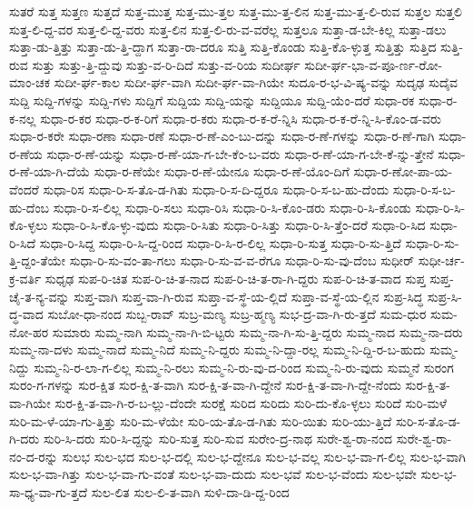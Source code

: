 {ಸುತರೆ
ಸುತ್ತ
ಸುತ್ತಣ
ಸುತ್ತದೆ
ಸುತ್ತ-ಮುತ್ತ
ಸುತ್ತ-ಮು-ತ್ತಲ
ಸುತ್ತ-ಮು-ತ್ತ-ಲಿನ
ಸುತ್ತ-ಮು-ತ್ತ-ಲಿ-ರುವ
ಸುತ್ತಲ
ಸುತ್ತಲಿ
ಸುತ್ತ-ಲಿ-ದ್ದ-ವರ
ಸುತ್ತ-ಲಿ-ದ್ದ-ವರು
ಸುತ್ತ-ಲಿನ
ಸುತ್ತ-ಲಿ-ರು-ವ-ವರೆಲ್ಲ
ಸುತ್ತಲೂ
ಸುತ್ತಾ-ಡ-ಬೇ-ಕಿಲ್ಲ
ಸುತ್ತಾ-ಡಲು
ಸುತ್ತಾ-ಡು-ತ್ತಿತ್ತು
ಸುತ್ತಾ-ಡು-ತ್ತಿ-ದ್ದಾಗ
ಸುತ್ತಾ-ರಾ-ದರೂ
ಸುತ್ತಿ
ಸುತ್ತಿ-ಕೊಂಡು
ಸುತ್ತಿ-ಕೊ-ಳ್ಳುತ್ತ
ಸುತ್ತಿತ್ತು
ಸುತ್ತಿದ
ಸುತ್ತಿ-ರುವ
ಸುತ್ತು
ಸುತ್ತು-ತ್ತಿ-ದ್ದುವು
ಸುತ್ತು-ವ-ರಿ-ದಿದೆ
ಸುತ್ತು-ವ-ರಿಯ
ಸುದೀರ್ಘ
ಸುದೀ-ರ್ಘ-ಭಾ-ವ-ಪೂ-ರ್ಣ-ರೋ-ಮಾಂ-ಚಕ
ಸುದೀ-ರ್ಘ-ಕಾಲ
ಸುದೀ-ರ್ಘ-ವಾಗಿ
ಸುದೀ-ರ್ಘ-ವಾ-ಗಿಯೇ
ಸುದೂ-ರ-ಭ-ವಿ-ಷ್ಯ-ವನ್ನು
ಸುದೃಢ
ಸುದೈವ
ಸುದ್ದಿ
ಸುದ್ದಿ-ಗಳನ್ನು
ಸುದ್ದಿ-ಗಳು
ಸುದ್ದಿಗೆ
ಸುದ್ದಿಯ
ಸುದ್ದಿ-ಯನ್ನು
ಸುದ್ದಿಯೂ
ಸುದ್ದಿ-ಯೆಂ-ದರೆ
ಸುಧಾ-ರಕ
ಸುಧಾ-ರ-ಕ-ನಲ್ಲ
ಸುಧಾ-ರ-ಕರ
ಸುಧಾ-ರ-ಕ-ರಿಗೆ
ಸುಧಾ-ರ-ಕರು
ಸುಧಾ-ರ-ಕ-ರೆ-ನ್ನಿಸಿ
ಸುಧಾ-ರ-ಕ-ರೆ-ನ್ನಿ-ಸಿ-ಕೊಂ-ಡ-ವರು
ಸುಧಾ-ರ-ಕರೇ
ಸುಧಾ-ರಣಾ
ಸುಧಾ-ರಣೆ
ಸುಧಾ-ರ-ಣೆ-ಎಂ-ಬು-ದನ್ನು
ಸುಧಾ-ರ-ಣೆ-ಗಳನ್ನು
ಸುಧಾ-ರ-ಣೆ-ಗಾಗಿ
ಸುಧಾ-ರ-ಣೆಯ
ಸುಧಾ-ರ-ಣೆ-ಯನ್ನು
ಸುಧಾ-ರ-ಣೆ-ಯಾ-ಗ-ಬೇ-ಕೆಂ-ಬ-ವರು
ಸುಧಾ-ರ-ಣೆ-ಯಾ-ಗ-ಬೇ-ಕೆ-ನ್ನು-ತ್ತೇನೆ
ಸುಧಾ-ರ-ಣೆ-ಯಾ-ಗಿ-ದೆಯೆ
ಸುಧಾ-ರ-ಣೆಯೇ
ಸುಧಾ-ರ-ಣೆ-ಯೇನೂ
ಸುಧಾ-ರ-ಣೆ-ಯೊಂ-ದಿಗೆ
ಸುಧಾ-ರ-ಣೋ-ಪಾ-ಯ-ವೆಂದರೆ
ಸುಧಾ-ರಿಸ
ಸುಧಾ-ರಿ-ಸ-ತೊ-ಡ-ಗಿತು
ಸುಧಾ-ರಿ-ಸ-ದಿ-ದ್ದರೂ
ಸುಧಾ-ರಿ-ಸ-ಬ-ಹು-ದೆಂದು
ಸುಧಾ-ರಿ-ಸ-ಬ-ಹು-ದೆಂಬ
ಸುಧಾ-ರಿ-ಸ-ಲಿಲ್ಲ
ಸುಧಾ-ರಿ-ಸಲು
ಸುಧಾ-ರಿಸಿ
ಸುಧಾ-ರಿ-ಸಿ-ಕೊಂ-ಡರು
ಸುಧಾ-ರಿ-ಸಿ-ಕೊಂಡು
ಸುಧಾ-ರಿ-ಸಿ-ಕೊ-ಳ್ಳಲು
ಸುಧಾ-ರಿ-ಸಿ-ಕೊ-ಳ್ಳು-ವುದು
ಸುಧಾ-ರಿ-ಸಿತು
ಸುಧಾ-ರಿ-ಸಿತ್ತು
ಸುಧಾ-ರಿ-ಸಿ-ತ್ತೆಂ-ದರೆ
ಸುಧಾ-ರಿ-ಸಿದ
ಸುಧಾ-ರಿ-ಸಿದೆ
ಸುಧಾ-ರಿ-ಸಿದ್ದ
ಸುಧಾ-ರಿ-ಸಿ-ದ್ದ-ರಿಂದ
ಸುಧಾ-ರಿ-ಸಿ-ರ-ಲಿಲ್ಲ
ಸುಧಾ-ರಿ-ಸುತ್ತ
ಸುಧಾ-ರಿ-ಸು-ತ್ತಿದೆ
ಸುಧಾ-ರಿ-ಸು-ತ್ತಿ-ದ್ದಂ-ತೆಯೇ
ಸುಧಾ-ರಿ-ಸು-ವಂ-ತಾ-ಗಲು
ಸುಧಾ-ರಿ-ಸು-ವ-ವ-ರೆಗೂ
ಸುಧಾ-ರಿ-ಸು-ವು-ದೆಂಬ
ಸುಧೀರ್
ಸುಧೀ-ರ್ಚ-ಕ್ರ-ವರ್ತಿ
ಸುಧೃಢ
ಸುಪ-ರಿ-ಚಿತ
ಸುಪ-ರಿ-ಚಿ-ತ-ನಾದ
ಸುಪ-ರಿ-ಚಿ-ತ-ರಾ-ಗಿ-ದ್ದರು
ಸುಪ-ರಿ-ಚಿ-ತ-ವಾದ
ಸುಪ್ತ
ಸುಪ್ತ-ಚೈ-ತ-ನ್ಯ-ವನ್ನು
ಸುಪ್ತ-ವಾಗಿ
ಸುಪ್ತ-ವಾ-ಗಿ-ರುವ
ಸುಪ್ತಾ-ವ-ಸ್ಥೆ-ಯ-ಲ್ಲಿದೆ
ಸುಪ್ತಾ-ವ-ಸ್ಥೆ-ಯ-ಲ್ಲಿನ
ಸುಪ್ರ-ಸಿದ್ಧ
ಸುಪ್ರ-ಸಿ-ದ್ಧ-ವಾದ
ಸುಬೋ-ಧಾ-ನಂದ
ಸುಬ್ಬ-ರಾವ್
ಸುಬ್ರ-ಮಣ್ಯ
ಸುಬ್ರ-ಹ್ಮಣ್ಯ
ಸುಭ-ದ್ರ-ವಾ-ಗಿ-ರು-ತ್ತದೆ
ಸುಮ-ಧುರ
ಸುಮ-ನೋ-ಹರ
ಸುಮಾರು
ಸುಮ್ಮ-ನಾಗಿ
ಸುಮ್ಮ-ನಾ-ಗಿ-ಬಿ-ಟ್ಟರು
ಸುಮ್ಮ-ನಾ-ಗಿ-ಸು-ತ್ತಿ-ದ್ದರು
ಸುಮ್ಮ-ನಾದ
ಸುಮ್ಮ-ನಾ-ದರು
ಸುಮ್ಮ-ನಾ-ದಳು
ಸುಮ್ಮ-ನಾದೆ
ಸುಮ್ಮ-ನಿದೆ
ಸುಮ್ಮ-ನಿ-ದ್ದರು
ಸುಮ್ಮ-ನಿ-ದ್ದಾ-ರಲ್ಲ
ಸುಮ್ಮ-ನಿ-ದ್ದಿ-ರ-ಬ-ಹುದು
ಸುಮ್ಮ-ನಿದ್ದು
ಸುಮ್ಮ-ನಿ-ರ-ಲಾ-ಗ-ಲಿಲ್ಲ
ಸುಮ್ಮ-ನಿ-ರಲು
ಸುಮ್ಮ-ನಿ-ರು-ವು-ದ-ರಿಂದ
ಸುಮ್ಮ-ನಿ-ರು-ವುದು
ಸುಮ್ಮನೆ
ಸುರಂಗ
ಸುರಂ-ಗ-ಗಳನ್ನು
ಸುರ-ಕ್ಷಿತ
ಸುರ-ಕ್ಷಿ-ತ-ವಾಗಿ
ಸುರ-ಕ್ಷಿ-ತ-ವಾ-ಗಿ-ದ್ದೇನೆ
ಸುರ-ಕ್ಷಿ-ತ-ವಾ-ಗಿ-ದ್ದೇ-ನೆಂದು
ಸುರ-ಕ್ಷಿ-ತ-ವಾ-ಗಿಯೇ
ಸುರ-ಕ್ಷಿ-ತ-ವಾ-ಗಿ-ರ-ಬ-ಲ್ಲು-ದೆಂದೇ
ಸುರಕ್ಷೆ
ಸುರಿದ
ಸುರಿದು
ಸುರಿ-ದು-ಕೊ-ಳ್ಳಲು
ಸುರಿದೆ
ಸುರಿ-ಮಳೆ
ಸುರಿ-ಮ-ಳೆ-ಯಾ-ಗು-ತ್ತಿತ್ತು
ಸುರಿ-ಮ-ಳೆಯೇ
ಸುರಿ-ಯ-ತೊ-ಡ-ಗಿತು
ಸುರಿ-ಯಿತು
ಸುರಿ-ಯು-ತ್ತಿದೆ
ಸುರಿ-ಸ-ತೊ-ಡ-ಗಿ-ದರು
ಸುರಿ-ಸಿ-ದರು
ಸುರಿ-ಸಿ-ದ್ದನ್ನು
ಸುರಿ-ಸುತ್ತ
ಸುರಿ-ಸುವ
ಸುರೇಂ-ದ್ರ-ನಾಥ
ಸುರೇ-ಶ್ವ-ರಾ-ನಂದ
ಸುರೇ-ಶ್ವ-ರಾ-ನಂ-ದ-ರನ್ನು
ಸುಲಭ
ಸುಲ-ಭದ
ಸುಲ-ಭ-ದಲ್ಲಿ
ಸುಲ-ಭ-ದ್ದೇನೂ
ಸುಲ-ಭ-ವಲ್ಲ
ಸುಲ-ಭ-ವಾ-ಗ-ಲಿಲ್ಲ
ಸುಲ-ಭ-ವಾಗಿ
ಸುಲ-ಭ-ವಾ-ಗಿತ್ತು
ಸುಲ-ಭ-ವಾ-ಗು-ವಂತೆ
ಸುಲ-ಭ-ವಾ-ದುದು
ಸುಲ-ಭವೆ
ಸುಲ-ಭ-ವೆಂದು
ಸುಲ-ಭವೇ
ಸುಲ-ಭ-ಸಾ-ಧ್ಯ-ವಾ-ಗು-ತ್ತದೆ
ಸುಲ-ಲಿತ
ಸುಲ-ಲಿ-ತ-ವಾಗಿ
ಸುಳಿ-ದಾ-ಡಿ-ದ್ದ-ರಿಂದ
}
